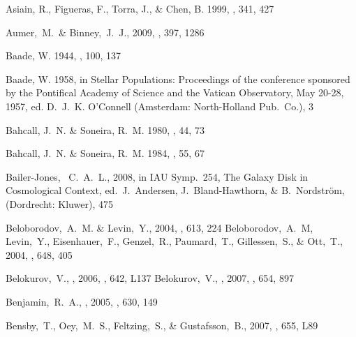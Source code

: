 \begin{thebibliography}{99}
{Asiain}, R., {Figueras}, F., {Torra}, J., \& {Chen}, B. 1999, \aap, 341, 427

  Aumer,~M.~\& Binney,~J.~J., 2009,
  \mnras, 397, 1286

{Baade}, W. 1944, \apj, 100, 137

{Baade}, W. 1958, in {Stellar Populations: Proceedings of the conference
  sponsored by the Pontifical Academy of Science and the Vatican Observatory,
  May 20-28, 1957}, ed. D.~J.~K. {O'Connell} ({Amsterdam}: {North-Holland
  Pub.~Co.}), 3

{Bahcall}, J.~N. \& {Soneira}, R.~M. 1980, \apjs, 44, 73

{Bahcall}, J.~N. \& {Soneira}, R.~M. 1984, \apjs, 55, 67

  Bailer-Jones, ~C.~A.~L., 2008,
  in IAU Symp.~254, The Galaxy Disk in Cosmological Context, ed.~J.~Andersen, J.~Bland-Hawthorn, \& B.~Nordstr\"{o}m, (Dordrecht: Kluwer), 475  

  Beloborodov,~A.~M. \& Levin,~Y., 2004,
  \apj, 613, 224
  Beloborodov,~A.~M, Levin,~Y., Eisenhauer,~F., Genzel,~R., 
  Paumard,~T., Gillessen,~S.,
  \& Ott,~T., 2004,
  \apj, 648, 405

  Belokurov,~V., \etal, 2006,
  \apjl, 642, L137
  Belokurov,~V., \etal, 2007,
  \apj, 654, 897

  Benjamin,~R.~A., \etal, 2005, \apj, 630, 149

  Bensby,~T., Oey,~M.~S., Feltzing,~S., \& Gustafsson,~B., 2007,
  \apjl, 655, L89


\end{thebibliography}
